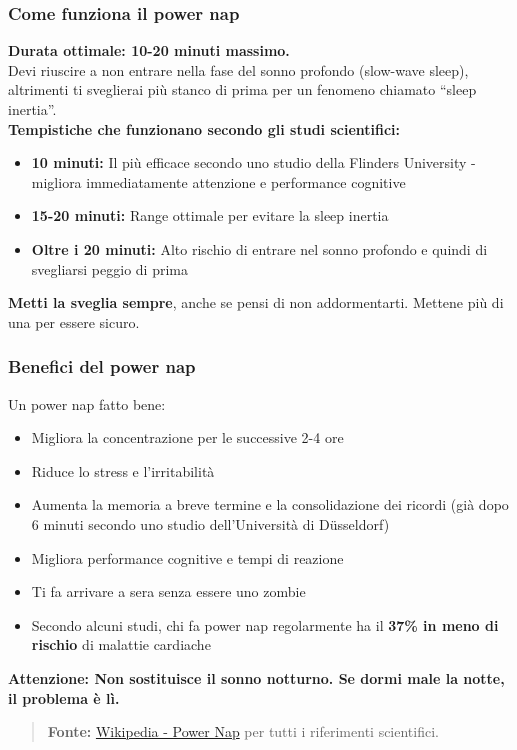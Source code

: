 \documentclass[18pt]{extarticle}
\begin{document}
\subsubsection{Come funziona il power nap}
\textbf{Durata ottimale: 10-20 minuti massimo.}\\
Devi riuscire a non entrare nella fase del sonno profondo (slow-wave sleep), altrimenti ti sveglierai più stanco di prima per un fenomeno chiamato ``sleep inertia''.\\
\textbf{Tempistiche che funzionano secondo gli studi scientifici:}
\begin{itemize}
\item \textbf{10 minuti:} Il più efficace secondo uno studio della Flinders University - migliora immediatamente attenzione e performance cognitive
\item \textbf{15-20 minuti:} Range ottimale per evitare la sleep inertia
\item \textbf{Oltre i 20 minuti:} Alto rischio di entrare nel sonno profondo e quindi di svegliarsi peggio di prima
\end{itemize}%
\textbf{Metti la sveglia sempre}, anche se pensi di non addormentarti. Mettene più di una per essere sicuro.


\subsubsection{Benefici del power nap}
Un power nap fatto bene:
\begin{itemize}
\item Migliora la concentrazione per le successive 2-4 ore
\item Riduce lo stress e l'irritabilità
\item Aumenta la memoria a breve termine e la consolidazione dei ricordi (già dopo 6 minuti secondo uno studio dell'Università di Düsseldorf)
\item Migliora performance cognitive e tempi di reazione
\item Ti fa arrivare a sera senza essere uno zombie
\item Secondo alcuni studi, chi fa power nap regolarmente ha il \textbf{37\% in meno di rischio} di malattie cardiache
\end{itemize}
\textbf{Attenzione: Non sostituisce il sonno notturno. Se dormi male la notte, il problema è lì.}
\begin{quote}
\textbf{Fonte:} \href{https://en.wikipedia.org/wiki/Power_nap}{Wikipedia - Power Nap} per tutti i riferimenti scientifici.
\end{quote}
\end{document}
